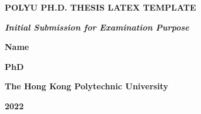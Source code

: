 \pagestyle{empty}

\vfill\vfill\vfill\vfill\vfill\vfill\vfill\vfill\null

\begin{center}

\vfill

{\LARGE\MakeUppercase{\textbf{PolyU Ph.D. Thesis Latex Template}} \par}

\textbf{\textit{\large Initial Submission for Examination Purpose}}
\vfill

{\LARGE \textbf{Name} \par}

\vspace{20pt}

{\LARGE \textbf{PhD} \par}

\vfill
\vfill

{\LARGE \textbf{The Hong Kong Polytechnic University} \par}

\vspace{20pt}

{\LARGE \textbf{2022}}
\vfill\vfill
\end{center}

\let\cleardoublepage\clearpage  %